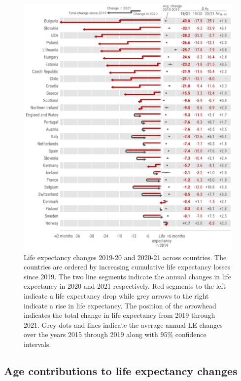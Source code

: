 \documentclass[12pt]{article}
\begin{document}
\begin{figure}[ht!]
    \centering
    \includegraphics{figure-1.pdf}
    \caption{Life expectancy changes 2019-20 and 2020-21 across countries. The countries are ordered by increasing cumulative life expectancy losses since 2019. The two line segments indicate the annual changes in life expectancy in 2020 and 2021 respectively. Red segments to the left indicate a life expectancy drop while grey arrows to the right indicate a rise in life expectancy. The position of the arrowhead indicates the total change in life expectancy from 2019 through 2021.
    Grey dots and lines indicate the average annual LE changes over the years 2015 through 2019 along with 95\% confidence intervals.}
    \label{fig:figure-1}
\end{figure}

\subsection*{Age contributions to life expectancy changes}
\end{document}
